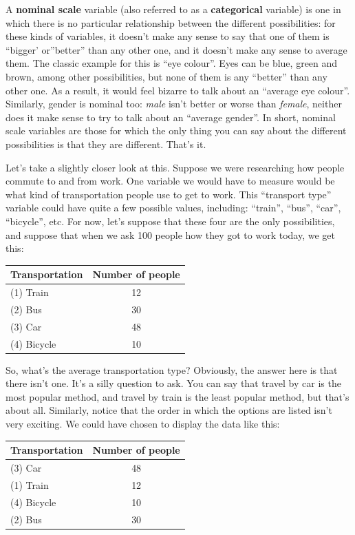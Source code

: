 \documentclass[
]{book}
\theoremstyle{definition}
\theoremstyle{definition}
\theoremstyle{definition}
\theoremstyle{definition}
\theoremstyle{remark}
\begin{document}
A \textbf{nominal scale} variable (also referred to as a \textbf{categorical} variable) is one in which there is no particular relationship between the different possibilities: for these kinds of variables, it doesn't make any sense to say that one of them is ``bigger' or''better'' than any other one, and it doesn't make any sense to average them. The classic example for this is ``eye colour''. Eyes can be blue, green and brown, among other possibilities, but none of them is any ``better'' than any other one. As a result, it would feel bizarre to talk about an ``average eye colour''. Similarly, gender is nominal too: \emph{male} isn't better or worse than \emph{female}, neither does it make sense to try to talk about an ``average gender''. In short, nominal scale variables are those for which the only thing you can say about the different possibilities is that they are different. That's it.

Let's take a slightly closer look at this. Suppose we were researching how people commute to and from work. One variable we would have to measure would be what kind of transportation people use to get to work. This ``transport type'' variable could have quite a few possible values, including: ``train'', ``bus'', ``car'', ``bicycle'', etc. For now, let's suppose that these four are the only possibilities, and suppose that when we ask 100 people how they got to work today, we get this:

\begin{table}[H]
\centering
\begin{tabular}{lc}
\toprule
Transportation & Number of people\\
\midrule
(1) Train & 12\\
(2) Bus & 30\\
(3) Car & 48\\
(4) Bicycle & 10\\
\bottomrule
\end{tabular}
\end{table}

So, what's the average transportation type? Obviously, the answer here is that there isn't one. It's a silly question to ask. You can say that travel by car is the most popular method, and travel by train is the least popular method, but that's about all. Similarly, notice that the order in which the options are listed isn't very exciting. We could have chosen to display the data like this:

\begin{table}[H]
\centering
\begin{tabular}{lc}
\toprule
Transportation & Number of people\\
\midrule
(3) Car & 48\\
(1) Train & 12\\
(4) Bicycle & 10\\
(2) Bus & 30\\
\bottomrule
\end{tabular}
\end{table}
\end{document}
